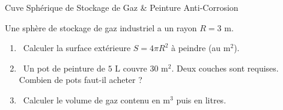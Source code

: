 \begin{exercice}[3 pts][\capValider]{Cuve Sphérique de Stockage de Gaz \& Peinture Anti-Corrosion}
\noindent
\begin{minipage}[c]{0.58\linewidth}
Une sphère de stockage de gaz industriel a un rayon $R = 3\text{ m}$.
\begin{enumerate}[leftmargin=1.2em, itemsep=1pt]
    \item \capRealiser\ Calculer la surface extérieure $S = 4\pi R^2$ à peindre (au $\text{m}^2$).
    \item \capValider\ Un pot de peinture de $5\text{ L}$ couvre $30\text{ m}^2$. Deux couches sont requises. Combien de pots faut-il acheter ?
    \item \capRealiser\ Calculer le volume de gaz contenu en $\text{m}^3$ puis en litres.
\end{enumerate}
\end{minipage}\hfill
\begin{minipage}[c]{0.38\linewidth}
\centering
{}
\end{minipage}

\vspace{1mm}
\lignesreponse[2]
\end{exercice}

